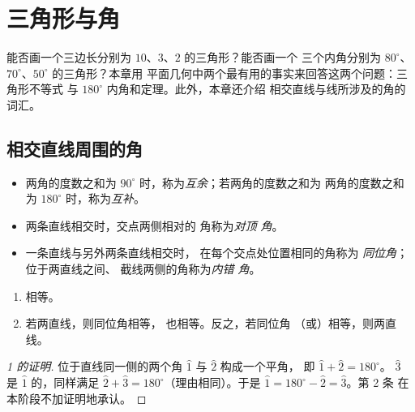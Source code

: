 \chapter{三角形与角}\label{ch:g7:triangles}

能否画一个三边长分别为 $10$、$3$、$2$ 的三角形？能否画一个
三个内角分别为 $80^\circ$、$70^\circ$、$50^\circ$ 的三角形？本章用
平面几何中两个最有用的事实来回答这两个问题：三角形不等式
与 $180^\circ$ 内角和定理。此外，本章还介绍
相交直线与线所涉及的角的词汇。

\section{相交直线周围的角}

\begin{definition}[成对的角]\label{def:g7:triangles:pairs}
\begin{itemize}
  \item 两角的度数之和为 $90^\circ$ 时，称为\emph{互余}；若两角的度数之和为
        两角的度数之和为
        $180^\circ$ 时，称为\emph{互补}。
  \item 两条直线相交时，交点两侧相对的
        角称为\emph{对顶
        角}。
  \item 一条直线与另外两条直线相交时，
        在每个交点处位置相同的角称为
        \emph{同位角}；位于两直线之间、
        截线两侧的角称为\emph{内错
        角}。
\end{itemize}
\end{definition}

\begin{theorem}[角的相等关系]\label{thm:g7:triangles:equalities}
\begin{enumerate}
  \item {}相等。
  \item 若两直线，则同位角相等，
        也相等。反之，若同位角
        （或）相等，则两直线。
\end{enumerate}
\end{theorem}

\begin{proof}[1 的证明]
位于直线同一侧的两个角 $\widehat{1}$ 与 $\widehat{2}$ 构成一个平角，
即 $\widehat 1 + \widehat 2 = 180^\circ$。
$\widehat 3$ 是 $\widehat 1$ 的，同样满足
$\widehat 2 + \widehat 3 = 180^\circ$（理由相同）。于是
$\widehat 1 = 180^\circ - \widehat 2 = \widehat 3$。第 2 条
在本阶段不加证明地承认。
\end{proof}

